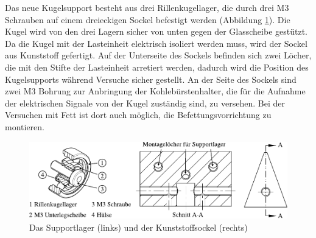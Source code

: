 Das neue Kugelsupport besteht aus drei Rillenkugellager, die durch drei M3 Schrauben auf einem dreieckigen Sockel befestigt werden (Abbildung \ref{fig:das_modifizierte_kugelsupport}).
Die Kugel wird von den drei Lagern sicher von unten gegen der Glasscheibe gestützt.
Da die Kugel mit der Lasteinheit elektrisch isoliert werden muss, wird der Sockel aus Kunststoff gefertigt.
Auf der Unterseite des Sockels befinden sich zwei Löcher, die mit den Stifte der Lasteinheit arretiert werden, dadurch wird die Position des Kugelsupports während Versuche sicher gestellt.
An der Seite des Sockels sind zwei M3 Bohrung zur Anbringung der Kohlebürstenhalter, die für die Aufnahme der elektrischen Signale von der Kugel zuständig sind, zu versehen.
Bei der Versuchen mit Fett ist dort auch möglich, die Befettungsvorrichtung zu montieren.
\begin{figure}[htb]
    \centering
    \includegraphics[]{./images/kugelsupport.pdf}
    \caption{Das Supportlager (links) und der Kunststoffsockel (rechts)}
    \label{fig:das_modifizierte_kugelsupport}
\end{figure}
%

